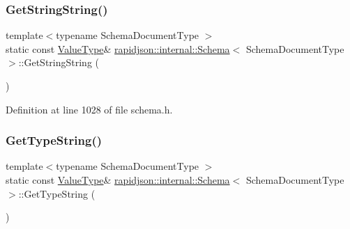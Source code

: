 \subsubsection{\texorpdfstring{GetStringString()}{GetStringString()}}
{\footnotesize\ttfamily template$<$typename Schema\+Document\+Type $>$ \\
static const \mbox{\hyperlink{classrapidjson_1_1internal_1_1_schema_a3979a9083c598195927c08c6e3ba91d1}{Value\+Type}}\& \mbox{\hyperlink{classrapidjson_1_1internal_1_1_schema}{rapidjson\+::internal\+::\+Schema}}$<$ Schema\+Document\+Type $>$\+::Get\+String\+String (\begin{DoxyParamCaption}{ }\end{DoxyParamCaption})\hspace{0.3cm}{\ttfamily [static]}}



Definition at line 1028 of file schema.\+h.


\begin{DoxyCode}{0}

\end{DoxyCode}
\mbox{\label{classrapidjson_1_1internal_1_1_schema_a43211fb10edc233e20ef8edbf69e84c8}} 
\subsubsection{\texorpdfstring{GetTypeString()}{GetTypeString()}}
{\footnotesize\ttfamily template$<$typename Schema\+Document\+Type $>$ \\
static const \mbox{\hyperlink{classrapidjson_1_1internal_1_1_schema_a3979a9083c598195927c08c6e3ba91d1}{Value\+Type}}\& \mbox{\hyperlink{classrapidjson_1_1internal_1_1_schema}{rapidjson\+::internal\+::\+Schema}}$<$ Schema\+Document\+Type $>$\+::Get\+Type\+String (\begin{DoxyParamCaption}{ }\end{DoxyParamCaption})\hspace{0.3cm}{\ttfamily [static]}}



